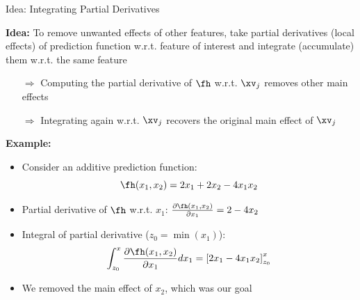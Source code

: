 \documentclass[11pt,compress,t,notes=noshow, aspectratio=169, xcolor=table]{beamer}
\begin{document}
\begin{frame}{Idea: Integrating Partial Derivatives}

\textbf{Idea:} To remove unwanted effects of other features, take partial derivatives (local effects) of prediction function w.r.t. feature of interest and integrate (accumulate) them w.r.t. the same feature

\begin{itemize}
\item[$\Rightarrow$] Computing the partial derivative of $\fh$ w.r.t. $\xv_j$ removes other main effects
\item[$\Rightarrow$] Integrating again w.r.t. $\xv_j$ recovers the original main effect of $\xv_j$
\end{itemize}

\pause %

\textbf{Example:}
\begin{itemize}[<+->]
\item Consider an additive prediction function: $$\fh(x_1, x_2) = 2x_1 + 2x_2 - 4x_1 x_2$$
\item Partial derivative of $\fh$ w.r.t. $x_1$:
$\frac{\partial \fh(x_1, x_2)}{\partial x_1} = 2 - 4x_2$
\item Integral of partial derivative ($z_0 = \min(x_1)$):
$$\int_{z_0}^{x} \frac{\partial \fh(x_1, x_2)}{\partial x_1} dx_1 = \left[2x_1 - 4x_1 x_2\right]_{z_0}^{x}$$
\item We removed the main effect of $x_2$, which was our goal %
\end{itemize}
\end{frame}
\end{document}
